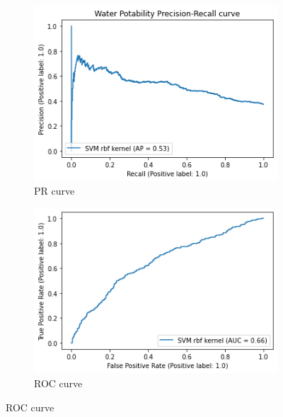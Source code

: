 \documentclass{article}
\begin{document}
	\begin{figure}[!h]
		\centering
		\begin{subfigure}[b]{0.35\textwidth}
			\centering
			\includegraphics[width=\textwidth]{../images/pr-svm}
			\caption*{PR curve}
			\label{fig:knn}
		\end{subfigure}
		\begin{subfigure}[b]{0.35\textwidth}
			\centering
			\includegraphics[width=\textwidth]{../images/roc-svm}
			\caption*{ROC curve}
			\label{fig:three sin x}
		\end{subfigure}
	\end{figure}
	\clearpage
\end{document}

